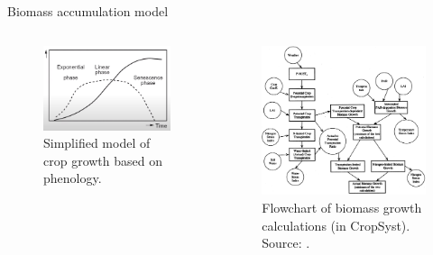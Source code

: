 \documentclass[11pt,dvipsnames,ignorenonframetext,aspectratio=169]{beamer}
\newcommand{\bcolumns}{\begin{columns}[T, onlytextwidth]}
\newcommand{\ecolumns}{\end{columns}}
\begin{document}
\begin{frame}{Biomass accumulation model}
\protect\hypertarget{biomass-accumulation-model}{}
\bcolumns
{}
\begin{figure}
\includegraphics[width=0.9\linewidth]{../images/crop_growth_model_phenology_based} \caption{Simplified model of crop growth based on phenology.}\label{fig:crop-growth-model-simple}
\end{figure}


\begin{figure}
\includegraphics[width=0.72\linewidth]{../images/biomass_growth_model} \caption{Flowchart of biomass growth calculations (in CropSyst). Source: \cite{stockle2003cropsyst}.}\label{fig:biomass-growth-model}
\end{figure}

\ecolumns
\end{frame}
\end{document}
